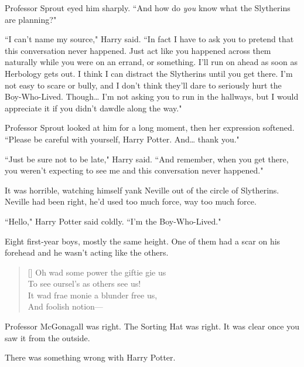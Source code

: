 \later

Professor Sprout eyed him sharply. ``And how do \emph{you} know what the Slytherins are planning?"

``I can't name my source," Harry said. ``In fact I have to ask you to pretend that this conversation never happened. Just act like you happened across them naturally while you were on an errand, or something. I'll run on ahead as soon as Herbology gets out. I think I can distract the Slytherins until you get there. I'm not easy to scare or bully, and I don't think they'll dare to seriously hurt the Boy-Who-Lived. Though{\ldots} I'm not asking you to run in the hallways, but I would appreciate it if you didn't dawdle along the way."

Professor Sprout looked at him for a long moment, then her expression softened. ``Please be careful with yourself, Harry Potter. And{\ldots} thank you."

``Just be sure not to be late," Harry said. ``And remember, when you get there, you weren't expecting to see me and this conversation never happened."

\later

It was horrible, watching himself yank Neville out of the circle of Slytherins. Neville had been right, he'd used too much force, way too much force.

``Hello," Harry Potter said coldly. ``I'm the Boy-Who-Lived."

Eight first-year boys, mostly the same height. One of them had a scar on his forehead and he wasn't acting like the others.

\baselineskip\settowidth{\versewidth}{It wad frae monie a blunder free us,}
\begin{verse}[\versewidth]
Oh wad some power the giftie gie us\\
To see oursel's as others see us!\\
It wad frae monie a blunder free us,\\
And foolish notion—
\end{verse}

Professor McGonagall was right. The Sorting Hat was right. It was clear once you saw it from the outside.

There was something wrong with Harry Potter.

